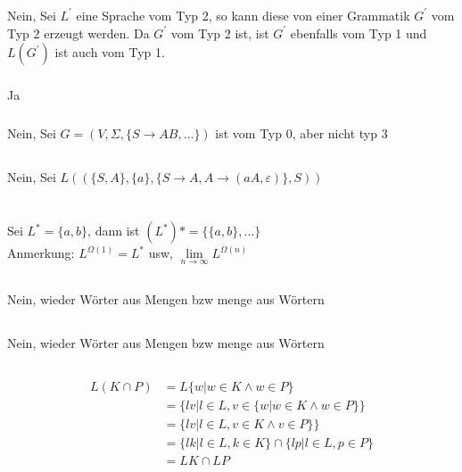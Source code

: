 \documentclass{article}
\begin{document}
\subsubsection{}
Nein, Sei $L^{'}$ eine Sprache vom Typ 2, so kann diese von einer Grammatik $G^{'}$ 
vom Typ 2 erzeugt werden. Da $G^{'}$ vom Typ 2 ist, ist $G^{'}$ ebenfalls vom Typ 1 und 
$L(G^{'})$ ist auch vom Typ 1.
\subsubsection{}
Ja
\subsubsection{}
Nein, Sei $G=(V, \Sigma, \{S\rightarrow AB, \hdots\})$ ist vom Typ 0, aber nicht typ 3
\subsection{}
Nein, Sei $L((\{S, A\}, \{a\}, \{S\rightarrow A, A\rightarrow (aA, \varepsilon)\}, S))$
\section{}
\subsection{}
Sei $L^* = \{a, b\}$, dann ist $(L^*)* = \{\{a, b\}, \hdots\}$\\
Anmerkung: $L^{\Omega(1)} = L^*$ usw, $\lim\limits_{n\rightarrow\infty}L^{\Omega(n)}$
\subsection{}
Nein, wieder Wörter aus Mengen bzw menge aus Wörtern
\subsection{}
Nein, wieder Wörter aus Mengen bzw menge aus Wörtern
\subsection{}
\begin{align*}
    L(K \cap P) &= L\{w | w\in K\land w\in P\}\\
    &= \{lv | l\in L, v\in\{w | w\in K\land w\in P\}\}\\
    &= \{lv | l\in L, v\in K\land v\in P\}\}\\
    &=\{lk | l\in L, k\in K\} \cap \{lp|l\in L, p\in P\}\\
    &=LK \cap LP
\end{align*}
\end{document}
